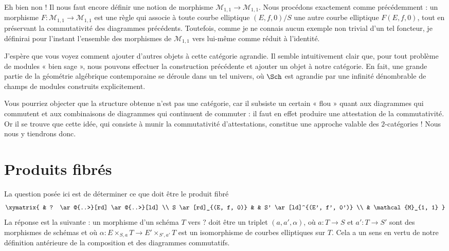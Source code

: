 \medskip\noindent
Eh bien non ! Il nous faut encore définir une notion de morphisme
$\mathcal{M}_{1, 1} \to \mathcal{M}_{1, 1}$. Nous procédons exactement comme
précédemment : un morphisme
$F : \mathcal{M}_{1, 1} \to \mathcal{M}_{1, 1}$
est une règle qui associe à toute courbe elliptique $(E, f, 0)/S$ une autre
courbe elliptique $F(E, f, 0)$, tout en préservant la commutativité des
diagrammes précédents. Toutefois, comme je ne connais aucun exemple non
trivial d'un tel foncteur, je définirai pour l'instant l'ensemble des
morphismes de $\mathcal{M}_{1, 1}$ vers lui-même comme réduit à l'identité.

\medskip\noindent
J'espère que vous voyez comment ajouter d'autres objets à cette catégorie
agrandie. Il semble intuitivement clair que, pour tout problème de modules
« bien sage », nous pouvons effectuer la construction précédente et ajouter
un objet à notre catégorie. En fait, une grande partie de la géométrie
algébrique contemporaine se déroule dans un tel univers, où $\Sch$ est
agrandie par une infinité dénombrable de champs de modules construits
explicitement.

\medskip\noindent
Vous pourriez objecter que la structure obtenue n'est pas une catégorie,
car il subsiste un certain « flou » quant aux diagrammes qui commutent et aux
combinaisons de diagrammes qui continuent de commuter : il faut en effet
produire une attestation de la commutativité. Or il se trouve que cette idée,
qui consiste à munir la commutativité d'attestations, constitue une approche
valable des $2$-catégories ! Nous nous y tiendrons donc.






\section{Produits fibrés}
\label{section-fibre-products}

\noindent
La question posée ici est de déterminer ce que doit être le produit fibré
$$
\xymatrix{
& ? \ar@{..>}[rd] \ar@{..>}[ld] \\
S \ar[rd]_{(E, f, 0)} & & S' \ar[ld]^{(E', f', 0')} \\
& \mathcal{M}_{1, 1}
}
$$
La réponse est la suivante : un morphisme d'un schéma $T$ vers $?$
doit être un triplet $(a, a', \alpha)$, où
$a : T \to S$ et $a' : T \to S'$ sont des morphismes de schémas et où
$\alpha : E \times_{S, a} T \to E' \times_{S', a'} T$ est un isomorphisme de
courbes elliptiques sur $T$. Cela a un sens en vertu de notre définition
antérieure de la composition et des diagrammes commutatifs.

